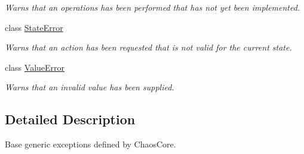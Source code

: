\begin{DoxyCompactItemize}
\begin{DoxyCompactList}\small\item\em Warns that an operations has been performed that has not yet been implemented. \end{DoxyCompactList}\item 
class \hyperlink{classchaos_1_1ex_1_1_state_error}{State\+Error}
\begin{DoxyCompactList}\small\item\em Warns that an action has been requested that is not valid for the current state. \end{DoxyCompactList}\item 
class \hyperlink{classchaos_1_1ex_1_1_value_error}{Value\+Error}
\begin{DoxyCompactList}\small\item\em Warns that an invalid value has been supplied. \end{DoxyCompactList}\end{DoxyCompactItemize}


\subsection{Detailed Description}
Base generic exceptions defined by Chaos\+Core. 